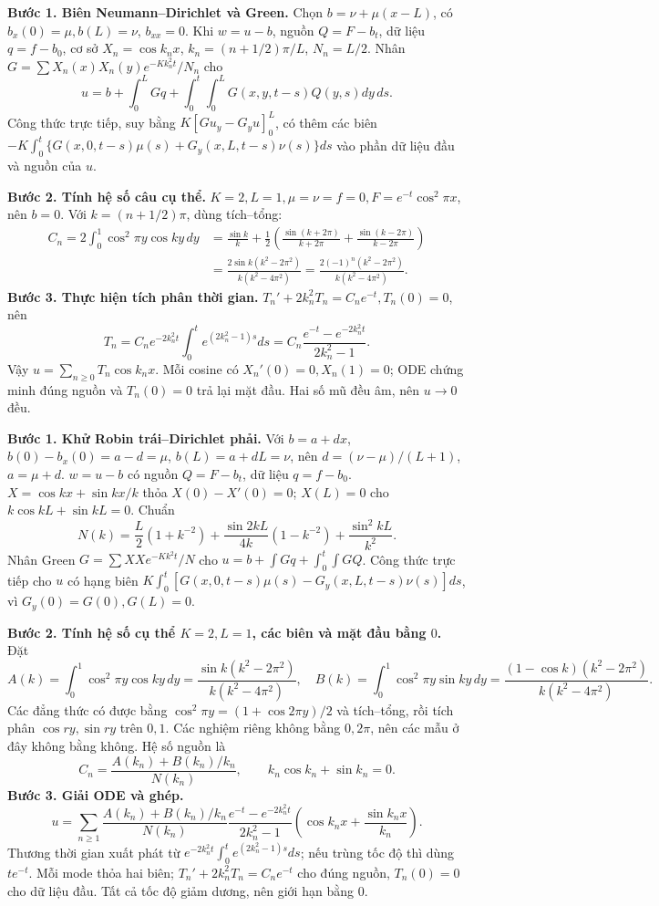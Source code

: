\textbf{Bước 1. Biên Neumann–Dirichlet và Green.}
Chọn $b=\nu+\mu(x-L)$, có $b_x(0)=\mu,b(L)=\nu$, $b_{xx}=0$. Khi $w=u-b$, nguồn $Q=F-b_t$, dữ liệu $q=f-b_0$, cơ sở $X_n=\cos k_nx$, $k_n=(n+1/2)\pi/L$, $N_n=L/2$. Nhân $G=\sum X_n(x)X_n(y)e^{-Kk_n^2t}/N_n$ cho
\[u=b+\int_0^LGq+\int_0^t\!\int_0^LG(x,y,t-s)Q(y,s)dy\,ds.\]
Công thức trực tiếp, suy bằng $K[Gu_y-G_yu]_0^L$, có thêm các biên $-K\int_0^t\{G(x,0,t-s)\mu(s)+G_y(x,L,t-s)\nu(s)\}ds$ vào phần dữ liệu đầu và nguồn của $u$.

\textbf{Bước 2. Tính hệ số câu cụ thể.}
$K=2,L=1,\mu=\nu=f=0,F=e^{-t}\cos^2\pi x$, nên $b=0$. Với $k=(n+1/2)\pi$, dùng tích–tổng:
\begin{align*}
C_n=2\int_0^1\cos^2\pi y\cos ky\,dy
&=\frac{\sin k}k+\frac12\left(\frac{\sin(k+2\pi)}{k+2\pi}
+\frac{\sin(k-2\pi)}{k-2\pi}\right)\\
&=\frac{2\sin k(k^2-2\pi^2)}{k(k^2-4\pi^2)}
=\frac{2(-1)^n(k^2-2\pi^2)}{k(k^2-4\pi^2)}.
\end{align*}
\textbf{Bước 3. Thực hiện tích phân thời gian.}
$T_n'+2k_n^2T_n=C_ne^{-t},T_n(0)=0$, nên
\[T_n=C_ne^{-2k_n^2t}\int_0^te^{(2k_n^2-1)s}ds
=C_n\frac{e^{-t}-e^{-2k_n^2t}}{2k_n^2-1}.\]
Vậy $u=\sum_{n\ge0}T_n\cos k_nx$. Mỗi cosine có $X_n'(0)=0,X_n(1)=0$; ODE chứng minh đúng nguồn và $T_n(0)=0$ trả lại mặt đầu. Hai số mũ đều âm, nên $u\to0$ đều.

\textbf{Bước 1. Khử Robin trái–Dirichlet phải.}
Với $b=a+dx$, $b(0)-b_x(0)=a-d=\mu$, $b(L)=a+dL=\nu$, nên $d=(\nu-\mu)/(L+1)$, $a=\mu+d$. $w=u-b$ có nguồn $Q=F-b_t$, dữ liệu $q=f-b_0$.
$X=\cos kx+\sin kx/k$ thỏa $X(0)-X'(0)=0$; $X(L)=0$ cho $k\cos kL+\sin kL=0$. Chuẩn
\[N(k)=\frac L2(1+k^{-2})+\frac{\sin2kL}{4k}(1-k^{-2})+\frac{\sin^2kL}{k^2}.\]
Nhân Green $G=\sum XXe^{-Kk^2t}/N$ cho $u=b+\int Gq+\int_0^t\int GQ$. Công thức trực tiếp cho $u$ có hạng biên $K\int_0^t[G(x,0,t-s)\mu(s)-G_y(x,L,t-s)\nu(s)]ds$, vì $G_y(0)=G(0),G(L)=0$.

\textbf{Bước 2. Tính hệ số cụ thể $K=2,L=1$, các biên và mặt đầu bằng $0$.}
Đặt
\[A(k)=\int_0^1\cos^2\pi y\cos ky\,dy
=\frac{\sin k(k^2-2\pi^2)}{k(k^2-4\pi^2)},\quad
B(k)=\int_0^1\cos^2\pi y\sin ky\,dy
=\frac{(1-\cos k)(k^2-2\pi^2)}{k(k^2-4\pi^2)}.\]
Các đẳng thức có được bằng $\cos^2\pi y=(1+\cos2\pi y)/2$ và tích–tổng, rồi tích phân $\cos ry,\sin ry$ trên $0,1$. Các nghiệm riêng không bằng $0,2\pi$, nên các mẫu ở đây không bằng không. Hệ số nguồn là
\[C_n=\frac{A(k_n)+B(k_n)/k_n}{N(k_n)},\qquad k_n\cos k_n+\sin k_n=0.\]
\textbf{Bước 3. Giải ODE và ghép.}
\[u=\sum_{n\ge1}\frac{A(k_n)+B(k_n)/k_n}{N(k_n)}
\frac{e^{-t}-e^{-2k_n^2t}}{2k_n^2-1}
\left(\cos k_nx+\frac{\sin k_nx}{k_n}\right).\]
Thương thời gian xuất phát từ $e^{-2k_n^2t}\int_0^te^{(2k_n^2-1)s}ds$; nếu trùng tốc độ thì dùng $te^{-t}$. Mỗi mode thỏa hai biên; $T_n'+2k_n^2T_n=C_ne^{-t}$ cho đúng nguồn, $T_n(0)=0$ cho dữ liệu đầu. Tất cả tốc độ giảm dương, nên giới hạn bằng $0$.

